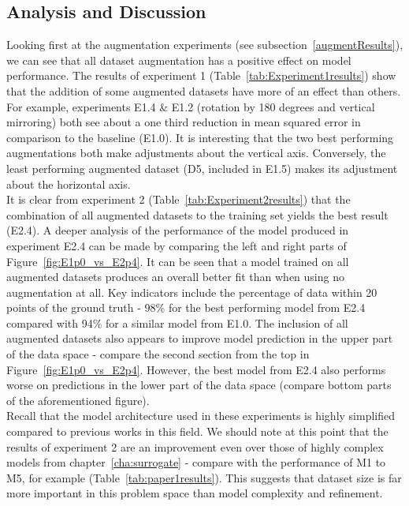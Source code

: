 \subsection{Analysis and Discussion}

Looking first at the augmentation experiments (see subsection~\ref{augmentResults}), we can see that all dataset augmentation has a positive effect on model performance. The results of experiment 1 (Table~\ref{tab:Experiment1results}) show that the addition of some augmented datasets have more of an effect than others. For example, experiments E1.4 \& E1.2 (rotation by 180 degrees and vertical mirroring) both see about a one third reduction in mean squared error in comparison to the baseline (E1.0). It is interesting that the two best performing augmentations both make adjustments about the vertical axis. Conversely, the least performing augmented dataset (D5, included in E1.5) makes its adjustment about the horizontal axis.
\\

\noindent
It is clear from experiment 2 (Table~\ref{tab:Experiment2results}) that the combination of all augmented datasets to the training set yields the best result (E2.4). A deeper analysis of the performance of the model produced in experiment E2.4 can be made by comparing the left and right parts of Figure~\ref{fig:E1p0_vs_E2p4}. It can be seen that a model trained on all augmented datasets produces an overall better fit than when using no augmentation at all. Key indicators include the percentage of data within 20 points of the ground truth - 98\% for the best performing model from E2.4 compared with 94\% for a similar model from E1.0. The inclusion of all augmented datasets also appears to improve model prediction in the upper part of the data space - compare the second section from the top in Figure~\ref{fig:E1p0_vs_E2p4}. However, the best model from E2.4 also performs worse on predictions in the lower part of the data space (compare bottom parts of the aforementioned figure).
\\

\noindent
Recall that the model architecture used in these experiments is highly simplified compared to previous works in this field. We should note at this point that the results of experiment 2 are an improvement even over those of highly complex models from chapter~\ref{cha:surrogate} - compare with the performance of M1 to M5, for example (Table~\ref{tab:paper1results}). This suggests that dataset size is far more important in this problem space than model complexity and refinement.
\\

